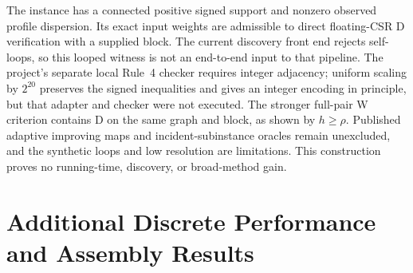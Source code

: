 \documentclass[sigconf,anonymous,review]{acmart}
\newcommand{\1}{\mathbf{1}}
\begin{document}
The instance has a connected positive signed support and nonzero observed
profile dispersion. Its exact input weights are admissible to direct
floating-CSR D verification with a supplied block. The current discovery
front end rejects self-loops, so this looped witness is not an end-to-end
input to that pipeline. The project's separate local Rule~4 checker
requires integer adjacency; uniform scaling by $2^{20}$ preserves the
signed inequalities and gives an integer encoding in principle, but that
adapter and checker were not executed. The stronger full-pair W criterion
contains D on the same graph and block, as shown by $h\ge\rho$.
Published adaptive improving maps and incident-subinstance oracles remain
unexcluded, and the synthetic loops and low resolution are limitations.
This construction proves no running-time, discovery, or broad-method gain.

\section{Additional Discrete Performance and Assembly Results}\label{app:additional-discrete-results}
\end{document}
